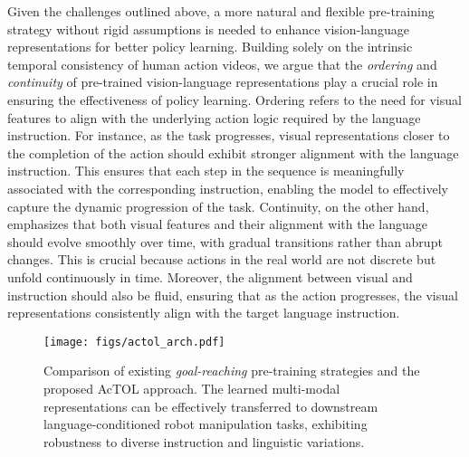Given the challenges outlined above, a more natural and flexible pre-training strategy without rigid assumptions is needed to enhance vision-language representations for better policy learning. Building solely on the intrinsic temporal consistency of human action videos, we argue that the \textit{ordering} and \textit{continuity} of pre-trained vision-language representations play a crucial role in ensuring the effectiveness of policy learning. Ordering refers to the need for visual features to align with the underlying action logic required by the language instruction. For instance, as the task progresses, visual representations closer to the completion of the action should exhibit stronger alignment with the language instruction. This ensures that each step in the sequence is meaningfully associated with the corresponding instruction, enabling the model to effectively capture the dynamic progression of the task. Continuity, on the other hand, emphasizes that both visual features and their alignment with the language should evolve smoothly over time, with gradual transitions rather than abrupt changes. This is crucial because actions in the real world are not discrete but unfold continuously in time. Moreover, the alignment between visual and instruction should also be fluid, ensuring that as the action progresses, the visual representations consistently align with the target language instruction.


\begin{figure*}[ht]
\begin{center}
\centerline{\texttt{[image: figs/actol\_arch.pdf]}}\vspace{-2ex}
\caption{Comparison of existing \textit{goal-reaching} pre-training strategies and the proposed AcTOL approach. The learned multi-modal representations can be effectively transferred to downstream language-conditioned robot manipulation tasks, exhibiting robustness to diverse instruction and linguistic variations.\vspace{-2ex}}
\label{fig:arch}
\end{center}\vspace{-3ex}
\end{figure*}

